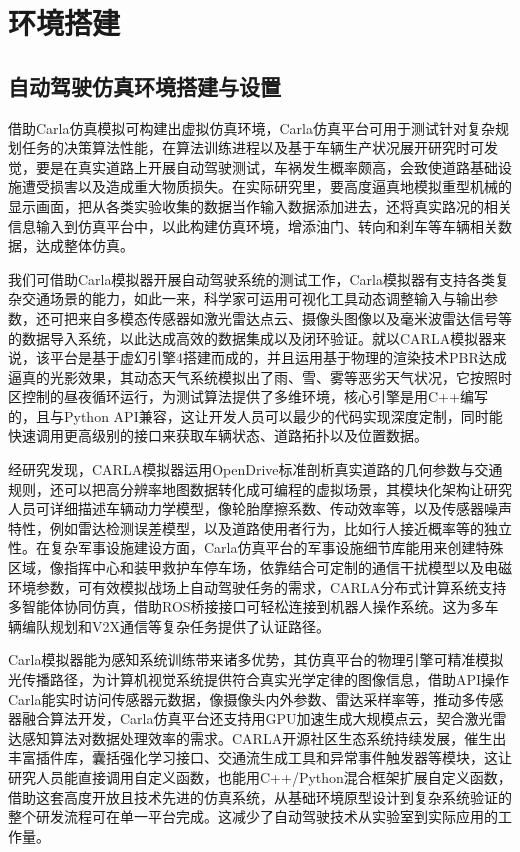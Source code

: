 \chapter{环境搭建}

\section{自动驾驶仿真环境搭建与设置}

借助Carla仿真模拟可构建出虚拟仿真环境，Carla仿真平台可用于测试针对复杂规划任务的决策算法性能，在算法训练进程以及基于车辆生产状况展开研究时可发觉，要是在真实道路上开展自动驾驶测试，车祸发生概率颇高，会致使道路基础设施遭受损害以及造成重大物质损失。在实际研究里，要高度逼真地模拟重型机械的显示画面，把从各类实验收集的数据当作输入数据添加进去，还将真实路况的相关信息输入到仿真平台中，以此构建仿真环境，增添油门、转向和刹车等车辆相关数据，达成整体仿真。

我们可借助Carla模拟器开展自动驾驶系统的测试工作，Carla模拟器有支持各类复杂交通场景的能力，如此一来，科学家可运用可视化工具动态调整输入与输出参数，还可把来自多模态传感器如激光雷达点云、摄像头图像以及毫米波雷达信号等的数据导入系统，以此达成高效的数据集成以及闭环验证。就以CARLA模拟器来说，该平台是基于虚幻引擎4搭建而成的，并且运用基于物理的渲染技术PBR达成逼真的光影效果，其动态天气系统模拟出了雨、雪、雾等恶劣天气状况，它按照时区控制的昼夜循环运行，为测试算法提供了多维环境，核心引擎是用C++编写的，且与Python API兼容，这让开发人员可以最少的代码实现深度定制，同时能快速调用更高级别的接口来获取车辆状态、道路拓扑以及位置数据。

经研究发现，CARLA\cite{dosovitskiy2017carla}模拟器运用OpenDrive标准剖析真实道路的几何参数与交通规则，还可以把高分辨率地图数据转化成可编程的虚拟场景，其模块化架构让研究人员可详细描述车辆动力学模型，像轮胎摩擦系数、传动效率等，以及传感器噪声特性，例如雷达检测误差模型，以及道路使用者行为，比如行人接近概率等的独立性。在复杂军事设施建设方面，Carla仿真平台的军事设施细节库能用来创建特殊区域，像指挥中心和装甲救护车停车场，依靠结合可定制的通信干扰模型以及电磁环境参数，可有效模拟战场上自动驾驶任务的需求，CARLA分布式计算系统支持多智能体协同仿真，借助ROS桥接接口可轻松连接到机器人操作系统。这为多车辆编队规划和V2X通信等复杂任务提供了认证路径。

Carla模拟器能为感知系统训练带来诸多优势，其仿真平台的物理引擎可精准模拟光传播路径，为计算机视觉系统提供符合真实光学定律的图像信息，借助API操作Carla能实时访问传感器元数据，像摄像头内外参数、雷达采样率等，推动多传感器融合算法开发，Carla仿真平台还支持用GPU加速生成大规模点云，契合激光雷达感知算法对数据处理效率的需求。CARLA开源社区生态系统持续发展，催生出丰富插件库，囊括强化学习接口、交通流生成工具和异常事件触发器等模块，这让研究人员能直接调用自定义函数，也能用C++/Python混合框架扩展自定义函数，借助这套高度开放且技术先进的仿真系统，从基础环境原型设计到复杂系统验证的整个研发流程可在单一平台完成。这减少了自动驾驶技术从实验室到实际应用的工作量。

